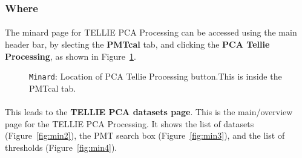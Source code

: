 \documentclass[12pt]{article}
\begin{document}
\subsubsection{Where}
\paragraph{}
The minard page for TELLIE PCA Processing can be accessed using the main header bar, by slecting the \textbf{PMTcal} tab, and clicking the \textbf{PCA Tellie Processing}, as shown in Figure~\ref{fig:min1}.

\begin{figure}
\centering
\noindent{}
  \caption{\centering \texttt{Minard}: Location of PCA Tellie Processing button.\hspace{\textwidth}This is inside the PMTcal tab.}
  \label{fig:min1}
\end{figure}

\paragraph{}
This leads to the \textbf{TELLIE PCA datasets page}. This is the main/overview page for the TELLIE PCA Processing. It shows the list of datasets (Figure~\ref{fig:min2}), the PMT search box (Figure~\ref{fig:min3}), and the list of thresholds (Figure~\ref{fig:min4}).
\end{document}
